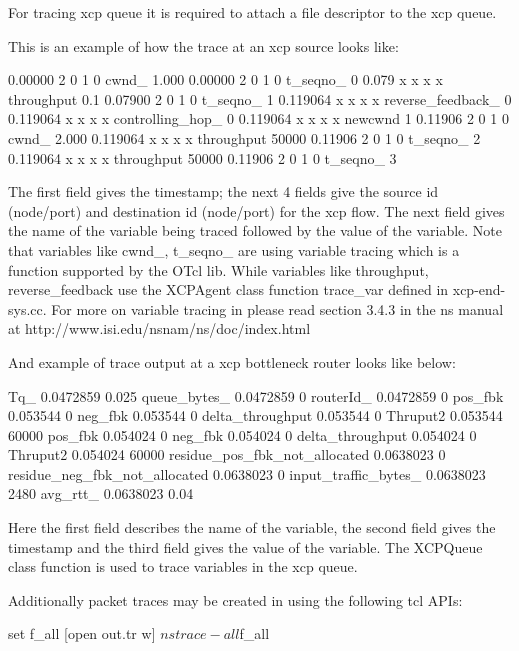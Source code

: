   For tracing xcp queue it is required to attach a file descriptor to
  the xcp queue.  
    
  This is an example of how the trace at an xcp source looks like:
  \begin{program}
    0.00000  2  0  1  0  cwnd_ 1.000 
    0.00000  2  0  1  0  t_seqno_ 0
    0.079 x x x x throughput 0.1
    0.07900  2  0  1  0  t_seqno_ 1
    0.119064 x x x x reverse_feedback_ 0
    0.119064 x x x x controlling_hop_ 0
    0.119064 x x x x newcwnd 1
    0.11906  2  0  1  0  cwnd_ 2.000 
    0.119064 x x x x throughput 50000
    0.11906  2  0  1  0  t_seqno_ 2
    0.119064 x x x x throughput 50000
    0.11906  2  0  1  0  t_seqno_ 3
  \end{program}
  
  The first field gives the timestamp; the next 4 fields give the
  source id (node/port) and destination id (node/port) for the xcp
  flow. The next field gives the name of the variable being traced
  followed by the value of the variable. Note that variables like 
  cwnd\_, t\_seqno\_ are using variable tracing which is a function
  supported by the OTcl lib. While variables like throughput,
  reverse\_feedback use the XCPAgent class function trace\_var defined
  in xcp-end-sys.cc. For more on variable tracing in \ns{} please read
  section 3.4.3 in the ns manual at
  http://www.isi.edu/nsnam/ns/doc/index.html  
    
    
  And example of trace output at a xcp bottleneck router looks like below:
  \begin{program}
    Tq_ 0.0472859 0.025
    queue_bytes_ 0.0472859 0
    routerId_ 0.0472859 0
    pos_fbk 0.053544 0
    neg_fbk 0.053544 0
    delta_throughput 0.053544 0
    Thruput2 0.053544 60000
    pos_fbk 0.054024 0
    neg_fbk 0.054024 0
    delta_throughput 0.054024 0
    Thruput2 0.054024 60000
    residue_pos_fbk_not_allocated 0.0638023 0
    residue_neg_fbk_not_allocated 0.0638023 0
    input_traffic_bytes_ 0.0638023 2480
    avg_rtt_ 0.0638023 0.04
  \end{program}
  
  Here the first field describes the name of the variable, the
  second field gives the timestamp and the third field gives the
  value of the variable. The XCPQueue class function 
  is used to trace variables in the xcp queue.
  
  Additionally packet traces may be created in \ns{} using the following
  tcl APIs:
  \begin{program}
    set f_all [open out.tr w]
    $ns trace-all $f_all
  \end{program}
  
